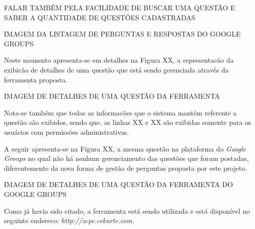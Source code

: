 FALAR TAMBÉM PELA FACILIDADE DE BUSCAR UMA QUESTÃO E SABER A QUANTIDADE DE
QUESTÕES CADASTRADAS

IMAGEM DA LISTAGEM DE PERGUNTAS E RESPOSTAS DO GOOGLE GROUPS

Neste momento apresenta-se em detalhes na Figura XX, a representacão da exibicão
de detalhes de uma questão que está sendo gerenciada através da ferramenta
proposta.

IMAGEM DE DETALHES DE UMA QUESTÃO DA FERRAMENTA

Nota-se também que todas as informacões que o sistema mantém referente a questão
são exibidos, sendo que, as linhas XX e XX são exibidas somente para os usuários
com permissões administrativas.

A seguir apresenta-se na Figura XX, a mesma questão na plataforma do
\textit{Google Groups} no qual não há nenhum gerenciamento das questões que
foram postadas, diferentemente da nova forma de gestão de perguntas proposta por
este projeto.

IMAGEM DE DETALHES DE UMA QUESTÃO DA FERRAMENTA DO GOOGLE GROUPS

Como já havia sido citado, a ferramenta está sendo utilizada e está disponível
no seguinte endereco: \textit{http://zcpe.cekurte.com}.

